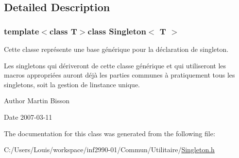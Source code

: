 \subsection{Detailed Description}
\subsubsection*{template$<$class T$>$class Singleton$<$ T $>$}

Cette classe représente une base générique pour la déclaration de singleton. 

Les singletons qui dériveront de cette classe générique et qui utiliseront les macros appropriées auront déjà les parties communes à pratiquement tous les singletons, soit la gestion de l\textquotesingle{}instance unique.

\begin{DoxyAuthor}{Author}
Martin Bisson 
\end{DoxyAuthor}
\begin{DoxyDate}{Date}
2007-\/03-\/11 
\end{DoxyDate}


The documentation for this class was generated from the following file\+:\begin{DoxyCompactItemize}
\item 
C\+:/\+Users/\+Louis/workspace/inf2990-\/01/\+Commun/\+Utilitaire/\hyperlink{_singleton_8h}{Singleton.\+h}\end{DoxyCompactItemize}
